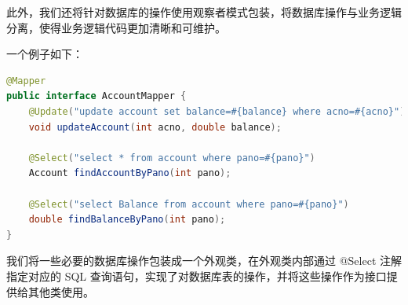 \documentclass[24pt,a4paper]{article}%
\begin{document}
此外，我们还将针对数据库的操作使用观察者模式包装，将数据库操作与业务逻辑分离，使得业务逻辑代码更加清晰和可维护。

一个例子如下：
\begin{lstlisting}[language=Java]
@Mapper
public interface AccountMapper {
    @Update("update account set balance=#{balance} where acno=#{acno}")
    void updateAccount(int acno, double balance);
    
    @Select("select * from account where pano=#{pano}")
    Account findAccountByPano(int pano);
    
    @Select("select Balance from account where pano=#{pano}")
    double findBalanceByPano(int pano);
}
\end{lstlisting}
我们将一些必要的数据库操作包装成一个外观类，在外观类内部通过 @Select 注解指定对应的 SQL 查询语句，实现了对数据库表的操作，并将这些操作作为接口提供给其他类使用。

\newpage
\end{document}

